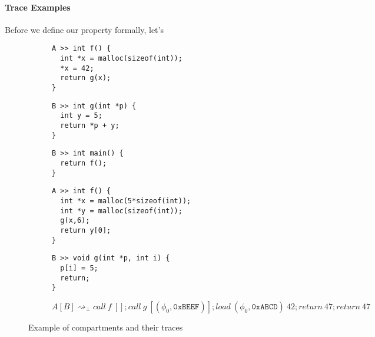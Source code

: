 \documentclass{article}
\begin{document}

\paragraph{Trace Examples}

Before we define our property formally, let's 

\begin{figure}
  \begin{subfigure}{\textwidth}
    \begin{minipage}[t]{0.42\textwidth}
\begin{verbatim}
A >> int f() {
  int *x = malloc(sizeof(int));
  *x = 42;
  return g(x);
}
\end{verbatim}
    \end{minipage}
    \begin{minipage}[t]{0.3\textwidth}
\begin{verbatim}
B >> int g(int *p) {
  int y = 5;
  return *p + y;
}
\end{verbatim}
    \end{minipage}
    \begin{minipage}[t]{0.25\textwidth}
\begin{verbatim}
B >> int main() {
  return f();
}
\end{verbatim}
    \end{minipage}
  
  \end{subfigure}
  \begin{subfigure}{\textwidth}
    \begin{minipage}[t]{0.5\textwidth}
\begin{verbatim}
A >> int f() {
  int *x = malloc(5*sizeof(int));
  int *y = malloc(sizeof(int));
  g(x,6);
  return y[0];
}
\end{verbatim}
    \end{minipage}
    \begin{minipage}[t]{0.4\textwidth}
\begin{verbatim}
B >> void g(int *p, int i) {
  p[i] = 5;
  return;
}
\end{verbatim}
    \end{minipage}
  
    \[A[B] \rightsquigarrow_\bot \mathit{call} ~ f ~ []; \mathit{call} ~ g ~ [(\phi_0, \mathtt{0xBEEF})];
    \mathit{load} ~ (\phi_0, \mathtt{0xABCD}) ~ 42; \mathit{return} ~ 47; \mathit{return} ~ 47\]
  \end{subfigure}
  
  \caption{Example of compartments and their traces}
  \label{fig:trexample}
\end{figure}
\end{document}
